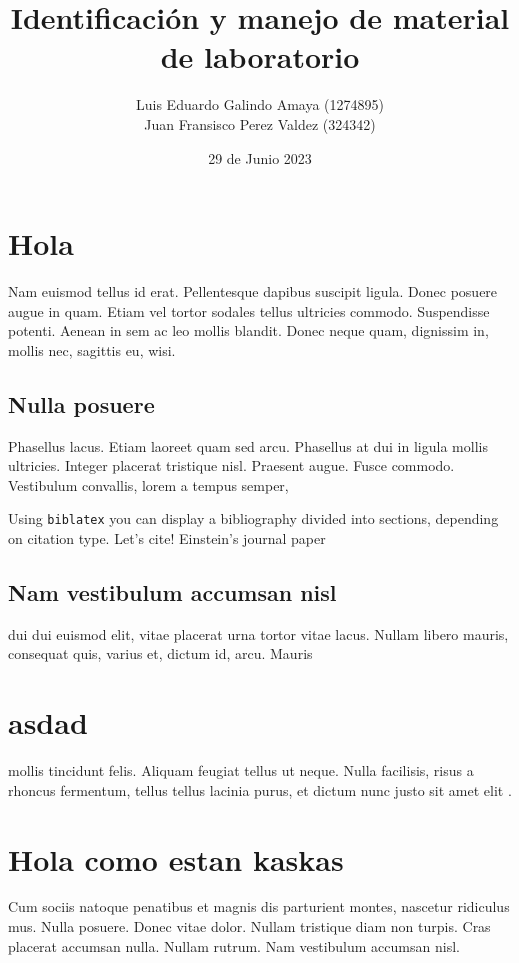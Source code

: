 \documentclass[11pt]{article}
\author{Luis Eduardo Galindo Amaya (1274895) \\
Juan Fransisco Perez Valdez  (324342)}
\date{29 de Junio 2023}
\title{Identificación y manejo de material de laboratorio}
\begin{document}
\tableofcontents
\pagebreak
{}

\section{Hola}
\label{sec:orgb4a4ffa}
Nam euismod tellus id erat.  Pellentesque dapibus suscipit ligula.  
Donec posuere augue in quam.  Etiam vel tortor sodales tellus ultricies
commodo.  Suspendisse potenti.  Aenean in sem ac leo mollis blandit.  
Donec neque quam, dignissim in, mollis nec, sagittis eu, wisi.  

\subsection{Nulla posuere}
\label{sec:org28ef1e9}
Phasellus lacus.  Etiam laoreet quam sed arcu.  Phasellus at dui in 
ligula mollis ultricies.  Integer placerat tristique nisl.  Praesent 
augue.  Fusce commodo.  Vestibulum convallis, lorem a tempus semper, 



Using \texttt{biblatex} you can display a bibliography divided into sections, 
depending on citation type. Let's cite! Einstein's journal paper 

\subsection{Nam vestibulum accumsan nisl}
\label{sec:org503026d}
dui dui euismod elit, vitae placerat urna tortor vitae lacus.  Nullam 
libero mauris, consequat quis, varius et, dictum id, arcu.  Mauris 

\section{asdad}
\label{sec:org5286396}
mollis tincidunt felis.  Aliquam feugiat tellus ut neque.  Nulla 
facilisis, risus a rhoncus fermentum, tellus tellus lacinia purus, et 
dictum nunc justo sit amet elit \cite{einstein}. 

\section{Hola como estan kaskas}
\label{sec:org9da28ff}
Cum sociis 
natoque penatibus et magnis dis parturient montes, nascetur ridiculus 
mus.  Nulla posuere.  Donec vitae dolor.  Nullam tristique diam non 
turpis.  Cras placerat accumsan nulla.  Nullam rutrum.  Nam vestibulum
accumsan nisl.
\end{document}
